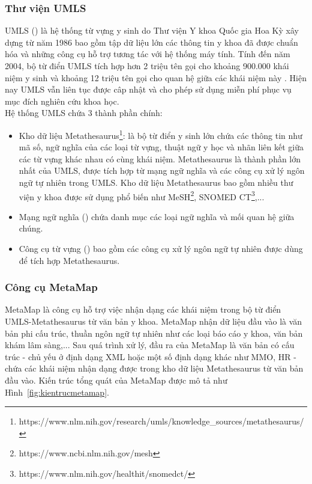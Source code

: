 \subsubsection*{Thư viện UMLS}
UMLS () là hệ thống từ vựng y sinh do Thư viện Y khoa Quốc gia Hoa Kỳ xây dựng từ năm 1986 bao gồm tập dữ liệu lớn các thông tin y khoa đã được chuẩn hóa và những công cụ hỗ trợ tương tác với hệ thống máy tính. Tính đến năm 2004, bộ từ điển UMLS tích hợp hơn 2 triệu tên gọi cho khoảng 900.000 khái niệm y sinh và khoảng 12 triệu tên gọi cho quan hệ giữa các khái niệm này \cite{Bodenreider2004}. Hiện nay UMLS vẫn liên tục được câp nhật và cho phép sử dụng miễn phí phục vụ mục đích nghiên cứu khoa học.\\

Hệ thống UMLS chứa 3 thành phần chính:
\begin{itemize}
\item Kho dữ liệu Metathesaurus\footnote{https://www.nlm.nih.gov/research/umls/knowledge\_sources/metathesaurus/}: là bộ từ điển y sinh lớn chứa các thông tin như mã số, ngữ nghĩa của các loại từ vựng, thuật ngữ y học và nhãn liên kết giữa các từ vựng khác nhau có cùng khái niệm. Metathesaurus là thành phần lớn nhất của UMLS, được tích hợp từ mạng ngữ nghĩa và các công cụ xử lý ngôn ngữ tự nhiên trong UMLS. Kho dữ liệu Metathesaurus bao gồm nhiều thư viện y khoa được sử dụng phổ biến như MeSH\footnote{https://www.ncbi.nlm.nih.gov/mesh}, SNOMED CT\footnote{https://www.nlm.nih.gov/healthit/snomedct/},...
\item Mạng ngữ nghĩa () chứa danh mục các loại ngữ nghĩa và mối quan hệ giữa chúng.
\item Công cụ từ vựng () bao gồm các công cụ xử lý ngôn ngữ tự nhiên được dùng để tích hợp Metathesaurus.
\end{itemize}

\subsubsection*{Công cụ MetaMap}
MetaMap là công cụ hỗ trợ việc nhận dạng các khái niệm trong bộ từ điển UMLS-Metathesaurus từ văn bản y khoa. MetaMap nhận dữ liệu đầu vào là văn bản phi cấu trúc, thuần ngôn ngữ tự nhiên như các loại báo cáo y khoa, văn bản khám lâm sàng,... Sau quá trình xử lý, đầu ra của MetaMap là văn bản có cấu trúc - chủ yếu ở định dạng XML hoặc một số định dạng khác như MMO, HR - chứa các khái niệm nhận dạng được trong kho dữ liệu Metathesaurus từ văn bản đầu vào. Kiến trúc tổng quát của MetaMap được mô tả như Hình~\ref{fig:kientrucmetamap}.\\

